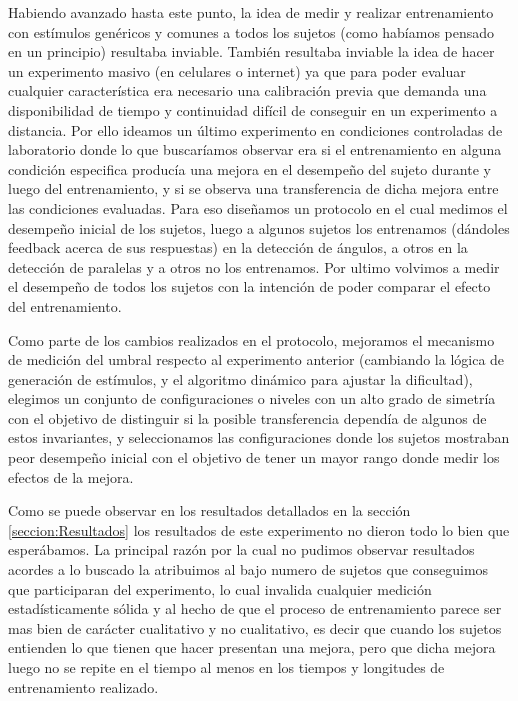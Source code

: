 \documentclass{article}
\begin{document}
    Habiendo avanzado hasta este punto, la idea de medir y realizar entrenamiento con estímulos genéricos y comunes a todos los sujetos (como habíamos pensado en un principio) resultaba inviable. También resultaba inviable la idea de hacer un experimento masivo (en celulares o internet) ya que para poder evaluar cualquier característica era necesario una calibración previa que demanda una disponibilidad de tiempo y continuidad difícil de conseguir en un experimento a distancia. Por ello ideamos un último experimento en condiciones controladas de laboratorio donde lo que buscaríamos observar era si el entrenamiento en alguna condición especifica producía una mejora en el desempeño del sujeto durante y luego del entrenamiento, y si se observa una transferencia de dicha mejora entre las condiciones evaluadas. Para eso diseñamos un protocolo en el cual medimos el desempeño inicial de los sujetos, luego a algunos sujetos los entrenamos (dándoles feedback acerca de sus respuestas) en la detección de ángulos, a otros en la detección de paralelas y a otros no los entrenamos. Por ultimo volvimos a medir el desempeño de todos los sujetos con la intención de poder comparar el efecto del entrenamiento. 
    
    Como parte de los cambios realizados en el protocolo, mejoramos el mecanismo de medición del umbral respecto al experimento anterior (cambiando la lógica de generación de estímulos, y el algoritmo dinámico para ajustar la dificultad), elegimos un conjunto de configuraciones o niveles con un alto grado de simetría con el objetivo de distinguir si la posible transferencia dependía de algunos de estos invariantes, y seleccionamos las configuraciones donde los sujetos mostraban peor desempeño inicial con el objetivo de tener un mayor rango donde medir los efectos de la mejora. 
    
    Como se puede observar en los resultados detallados en la sección \ref{seccion:Resultados} los resultados de este experimento no dieron todo lo bien que esperábamos. La principal razón por la cual no pudimos observar resultados acordes a lo buscado la atribuimos al bajo numero de sujetos que conseguimos que participaran del experimento, lo cual invalida cualquier medición estadísticamente sólida y al hecho de que el proceso de entrenamiento parece ser mas bien de carácter cualitativo y no cualitativo, es decir que cuando los sujetos entienden lo que tienen que hacer presentan una mejora, pero que dicha mejora luego no se repite en el tiempo al menos en los tiempos y longitudes de entrenamiento realizado. 
    
\end{document}
